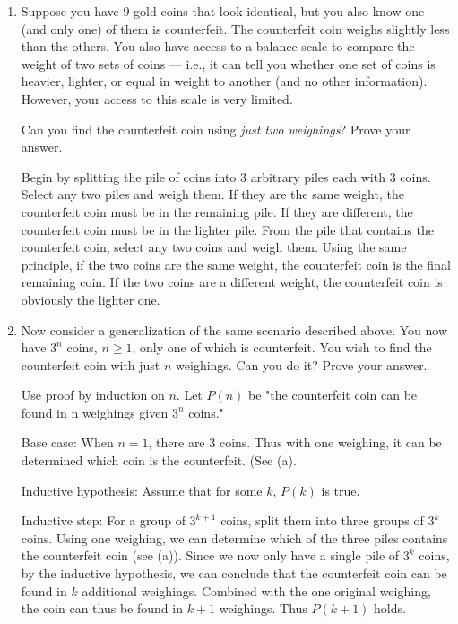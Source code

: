 \documentclass[11pt]{article}
\newenvironment{Parts}{\begin{enumerate}[label=(\alph*)]}{\end{enumerate}}
\newcommand*{\Part}{\item}
\newenvironment{Answer}{\vspace{20pt}}{\vspace{20pt}}
\begin{document}
\begin{Parts}

\Part
Suppose you have $9$ gold coins that look identical, but you also know
one (and only one)
of them is counterfeit. The counterfeit coin weighs slightly less
than the others. You also have access to a balance scale to compare
the weight of two sets of coins --- i.e., it can tell you whether
one set of coins is heavier, lighter, or equal in weight to another
(and no other information). However, your access to this scale is
very limited.

Can you find the counterfeit coin using {\em just two weighings}?
Prove your answer.

\begin{Answer}

Begin by splitting the pile of coins into 3 arbitrary piles each with 3 coins. Select any two piles and weigh them. If they are the same weight, the counterfeit coin must be in the remaining pile. If they are different, the counterfeit coin must be in the lighter pile. From the pile that contains the counterfeit coin, select any two coins and weigh them. Using the same principle, if the two coins are the same weight, the counterfeit coin is the final remaining coin. If the two coins are a different weight, the counterfeit coin is obviously the lighter one.

\end{Answer}

\Part
Now consider a generalization of the same scenario described above.
You now have $3^n$ coins, $n \geq 1$, only one of which is counterfeit.
You wish to find the counterfeit coin with just $n$ weighings.
Can you do it? Prove your answer.


\begin{Answer}

Use proof by induction on $n$. Let $P(n)$ be "the counterfeit coin can be found in n weighings given $3^n$ coins."

Base case: When $n=1$, there are 3 coins. Thus with one weighing, it can be determined which coin is the counterfeit. (See (a).

Inductive hypothesis: Assume that for some $k$, $P(k)$ is true.

Inductive step: For a group of $3^{k+1}$ coins, split them into three groups of $3^k$ coins. Using one weighing, we can determine which of the three piles contains the counterfeit coin (see (a)). Since we now only have a single pile of $3^k$ coins, by the inductive hypothesis, we can conclude that the counterfeit coin can be found in $k$ additional weighings. Combined with the one original weighing, the coin can thus be found in $k+1$ weighings. Thus $P(k+1)$ holds.

\end{Answer}
\end{Parts}
\end{document}
